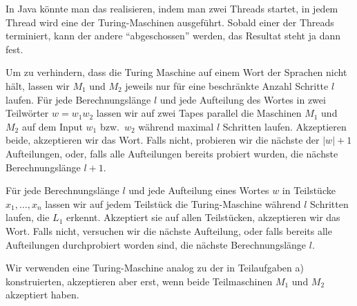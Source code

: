\begin{loesung}
\begin{teilaufgaben}
In Java könnte man das realisieren, indem man zwei Threads startet,
in jedem Thread wird eine der Turing-Maschinen ausgeführt.
Sobald einer der Threads terminiert, kann der andere ``abgeschossen'' werden,
das Resultat steht ja dann fest.
\item
Um zu verhindern, dass die Turing Maschine auf einem Wort der
Sprachen nicht hält, lassen wir $M_1$ und $M_2$ jeweils nur für eine
beschränkte Anzahl Schritte $l$ laufen.
Für jede Berechnungslänge $l$ und jede Aufteilung des Wortes in zwei
Teilwörter $w=w_1w_2$ lassen wir auf zwei Tapes parallel die
Maschinen $M_1$ und $M_2$ auf dem Input $w_1$ bzw.~$w_2$ während
maximal $l$ Schritten laufen.
Akzeptieren beide, akzeptieren wir das Wort.
Falls nicht, probieren wir die nächste der $|w|+1$ Aufteilungen,
oder, falls alle Aufteilungen bereits probiert wurden, die nächste
Berechnungslänge $l+1$.
\item
Für jede Berechnungslänge $l$ und
jede Aufteilung eines Wortes $w$ in Teilstücke $x_1,\dots,x_n$
lassen
wir auf jedem Teilstück die Turing-Maschine während $l$ Schritten
laufen, die
$L_1$ erkennt. Akzeptiert sie auf allen Teilstücken, akzeptieren wir
das Wort.
Falls nicht, versuchen wir die nächste Aufteilung, oder falls
bereits alle Aufteilungen durchprobiert worden sind, die nächste
Berechnungslänge $l$.
\item Wir verwenden eine Turing-Maschine analog zu der in Teilaufgaben a)
konstruierten, akzeptieren aber erst, wenn beide Teilmaschinen
$M_1$ und $M_2$ akzeptiert haben.
\qedhere
\end{teilaufgaben}
\end{loesung}

